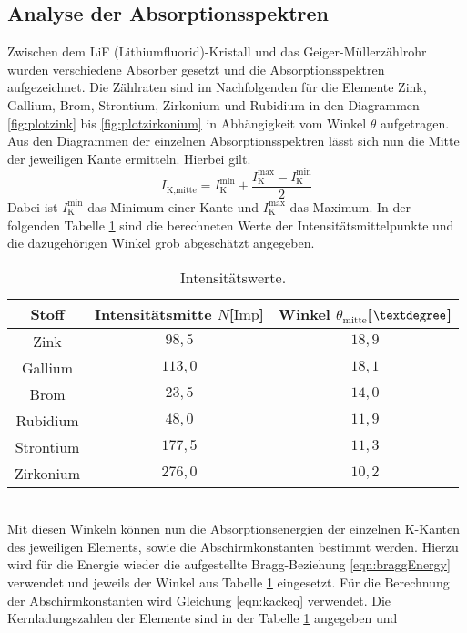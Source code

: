\subsection{Analyse der Absorptionsspektren}
Zwischen dem LiF (Lithiumfluorid)-Kristall und das Geiger-Müllerzählrohr wurden verschiedene Absorber gesetzt und die Absorptionsspektren aufgezeichnet.
Die Zählraten sind im Nachfolgenden für die Elemente Zink, Gallium, Brom, Strontium, Zirkonium und Rubidium in den Diagrammen \ref{fig:plotzink} bis \ref{fig:plotzirkonium} in Abhängigkeit vom 
Winkel $\theta$ aufgetragen.
Aus den Diagrammen der einzelnen Absorptionsspektren lässt sich nun die Mitte der jeweiligen Kante ermitteln.
Hierbei gilt.
\begin{equation}
I_{\text{K,mitte}} = I_{\text{K}}^{\text{min}} + \frac{I_{\text{K}}^{\text{max}} - I_{\text{K}}^{\text{min}}}{2}
\end{equation}
Dabei ist $I_{\text{K}}^{\text{min}}$ das Minimum einer Kante und $I_{\text{K}}^{\text{max}}$ das Maximum.
In der folgenden Tabelle \ref{tab:whatever} sind die berechneten Werte der Intensitätsmittelpunkte und die dazugehörigen Winkel grob abgeschätzt angegeben.
\begin{table}
\centering
\caption{Intensitätswerte.}
\label{tab:whatever}
\begin{tabular}{c c c}
    \toprule
    Stoff & Intensitätsmitte $N$[$\text{Imp}$] & Winkel $\theta_{\text{mitte}}$[$\textdegree$]\\
    \midrule
    Zink       &  $98{,5}$ & $18{,}9$ \\
    Gallium    &  $113{,}0$ & $18{,}1$ \\
    Brom          & $23{,}5$ & $14{,}0$ \\
     Rubidium     & $48{,}0$ & $11{,}9$ \\
      Strontium   & $177{,}5$ & $11{,}3$ \\
       Zirkonium  & $276{,}0$ & $10{,}2$ \\
    \bottomrule
\end{tabular}
\end{table}
\\
\newline %
Mit diesen Winkeln können nun die Absorptionsenergien der einzelnen K-Kanten des jeweiligen Elements, sowie die Abschirmkonstanten bestimmt werden.
Hierzu wird für die Energie wieder die aufgestellte Bragg-Beziehung \eqref{eqn:braggEnergy} verwendet und jeweils der Winkel aus Tabelle \ref{tab:whatever}
eingesetzt. Für die Berechnung der Abschirmkonstanten wird Gleichung \eqref{eqn:kackeq} verwendet. Die Kernladungszahlen der Elemente sind in der Tabelle \ref{tab:whatever} angegeben und
